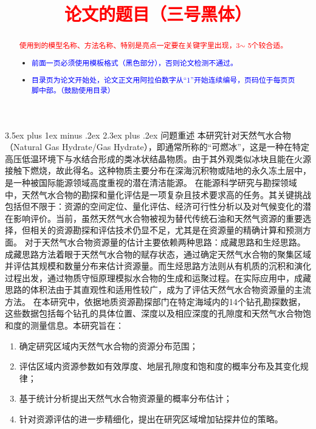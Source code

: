 \documentclass[12pt,a4paper]{nmmcm}
\title{\textcolor{red}{论文的题目（三号黑体）}}
\date{}
\makeatletter
\renewcommand\section{\@startsection{section}{1}{0pt}%
    {3.5ex plus 1ex minus .2ex}%
    {2.3ex plus .2ex}%
    {\normalfont\LARGE\bfseries}}
\makeatother
\begin{document}
\begin{abstract}
  

  \begin{keywords}
    {\song\xiaosihao
      \textcolor{red}{使用到的模型名称、方法名称、特别是亮点一定要在关键字里出现，3$\sim$ 5个较合适。}}
  \end{keywords}

  \begin{itemize}
    \item \textcolor{blue}{前面一页必须使用模板格式（黑色部分），否则论文检测不通过。}
    \item \textcolor{blue}{ 目录页为论文开始处，论文正文用阿拉伯数字从“1”开始连续编号，页码位于每页页脚中部。（鼓励使用目录）}
  \end{itemize}

\end{abstract}
\maketitle
\renewcommand{\contentsname}{\centerline{\sanhao\bfseries\HEI 目\quad 录}}
\tableofcontents

\newpage
\setcounter{page}{1}
\pagestyle{fancy}
\section{问题重述}
本研究针对天然气水合物（Natural Gas Hydrate/Gas Hydrate），即通常所称的“可燃冰”，这是一种在特定高压低温环境下与水结合形成的类冰状结晶物质。由于其外观类似冰块且能在火源接触下燃烧，故此得名。这种物质主要分布在深海沉积物或陆地的永久冻土层中，是一种被国际能源领域高度重视的潜在清洁能源。
在能源科学研究与勘探领域中，天然气水合物的勘探和量化评估是一项复杂且技术要求高的任务。其关键挑战包括但不限于：资源的空间定位、量化评估、经济可行性分析以及对气候变化的潜在影响评价。当前，虽然天然气水合物被视为替代传统石油和天然气资源的重要选择，但相关的资源勘探和评估技术仍显不足，尤其是在资源量的精确计算和预测方面。
对于天然气水合物资源量的估计主要依赖两种思路：成藏思路和生烃思路。成藏思路方法着眼于天然气水合物的赋存状态，通过确定天然气水合物的聚集区域并评估其规模和数量分布来估计资源量。而生烃思路方法则从有机质的沉积和演化过程出发，通过物质守恒原理模拟水合物的生成和运聚过程。在实际应用中，成藏思路的体积法由于其直观性和适用性较广，成为了评估天然气水合物资源量的主流方法。
在本研究中，依据地质资源勘探部门在特定海域内的14个钻孔勘探数据，这些数据包括每个钻孔的具体位置、深度以及相应深度的孔隙度和天然气水合物饱和度的测量信息。本研究旨在：
\begin{enumerate}
  \item 确定研究区域内天然气水合物的资源分布范围；
  \item 评估区域内资源参数如有效厚度、地层孔隙度和饱和度的概率分布及其变化规律；
  \item 基于统计分析提出天然气水合物资源量的概率分布估计；
  \item 针对资源评估的进一步精细化，提出在研究区域增加钻探井位的策略。
\end{enumerate}
\end{document}
